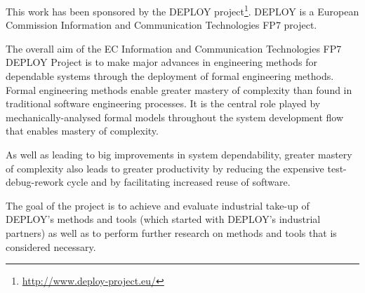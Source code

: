 \documentclass[12pt]{book}
\begin{document}
This work has been sponsored by the DEPLOY project\footnote{\url{http://www.deploy-project.eu/}}.  DEPLOY is a European Commission Information and Communication Technologies FP7 project.

The overall aim of the EC Information and Communication Technologies FP7 DEPLOY Project is to make major advances in engineering methods for dependable systems through the deployment of formal engineering methods. Formal engineering methods enable greater mastery of complexity than found in traditional software engineering processes. It is the central role played by mechanically-analysed formal models throughout the system development flow that enables mastery of complexity.

As well as leading to big improvements in system dependability, greater mastery of complexity also leads to greater productivity by reducing the expensive test-debug-rework cycle and by facilitating increased reuse of software.

The goal of the project is to achieve and evaluate industrial take-up of DEPLOY's methods and tools (which started with DEPLOY's industrial partners) as well as to perform further research on methods and tools that is considered necessary.



% 







\clearpage
{} 
\printindex
\end{document}
